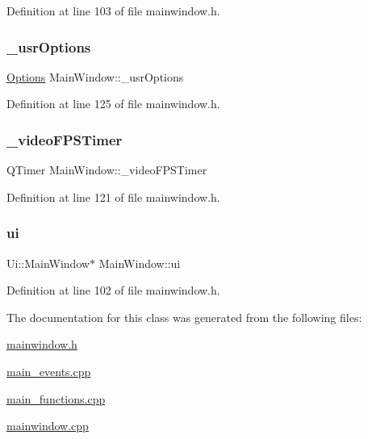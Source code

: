 Definition at line 103 of file mainwindow.\+h.

\mbox{\label{classMainWindow_a0f1a92e35aed746b3e7666e7d62b8605}} 
\subsubsection{\texorpdfstring{\_usrOptions}{\_usrOptions}}
{\footnotesize\ttfamily \mbox{\hyperlink{structOptions}{Options}} Main\+Window\+::\+\_\+usr\+Options\hspace{0.3cm}{\ttfamily [private]}}



Definition at line 125 of file mainwindow.\+h.

\mbox{\label{classMainWindow_a13da2145ec632c79dd1c61ec1bd7a792}} 
\subsubsection{\texorpdfstring{\_videoFPSTimer}{\_videoFPSTimer}}
{\footnotesize\ttfamily Q\+Timer Main\+Window\+::\+\_\+video\+F\+P\+S\+Timer\hspace{0.3cm}{\ttfamily [private]}}



Definition at line 121 of file mainwindow.\+h.

\mbox{\label{classMainWindow_a35466a70ed47252a0191168126a352a5}} 
\subsubsection{\texorpdfstring{ui}{ui}}
{\footnotesize\ttfamily Ui\+::\+Main\+Window$\ast$ Main\+Window\+::ui\hspace{0.3cm}{\ttfamily [private]}}



Definition at line 102 of file mainwindow.\+h.



The documentation for this class was generated from the following files\+:\begin{DoxyCompactItemize}
\item 
\mbox{\hyperlink{mainwindow_8h}{mainwindow.\+h}}\item 
\mbox{\hyperlink{main__events_8cpp}{main\+\_\+events.\+cpp}}\item 
\mbox{\hyperlink{main__functions_8cpp}{main\+\_\+functions.\+cpp}}\item 
\mbox{\hyperlink{mainwindow_8cpp}{mainwindow.\+cpp}}\end{DoxyCompactItemize}
